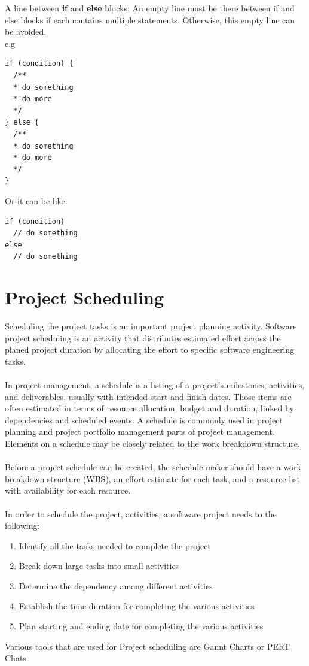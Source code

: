 \begin{enumerate}
A line between \textbf{if} and \textbf{else} blocks: An empty line must be there between if and else blocks if each contains multiple statements. Otherwise, this empty line can be avoided.\\
e.g
\begin{verbatim}
if (condition) {    
  /**
  * do something  
  * do more 
  */  
} else {  
  /**
  * do something  
  * do more 
  */  
}
\end{verbatim}
Or it can be like: 
\begin{verbatim}
if (condition)    
  // do something  
else  
  // do something 
\end{verbatim}
\end{enumerate}


\section{Project Scheduling} %
\label{sec:project_scheduling_}
Scheduling the project tasks is an important project planning activity. Software project scheduling is an activity that distributes estimated effort across the planed project duration by allocating the effort to specific software engineering tasks.\\\\
In project management, a schedule is a listing of a project's milestones, activities, and deliverables, usually with intended start and finish dates. Those items are often estimated in terms of resource allocation, budget and duration, linked by dependencies and scheduled events. A schedule is commonly used in project planning and project portfolio management parts of project management. Elements on a schedule may be closely related to the work breakdown structure.\\\\
Before a project schedule can be created, the schedule maker should have a work breakdown structure (WBS), an effort estimate for each task, and a resource list with availability for each resource.\\\\
In order to schedule the project, activities, a software project needs to the following:
\begin{enumerate}
\item Identify all the tasks needed to complete the project
\item Break down large tasks into small activities
\item Determine the dependency among different activities
\item Establish the time duration for completing the various activities
\item Plan starting and ending date for completing the various activities
\end{enumerate}
Various tools that are used for Project scheduling are Gannt Charts or PERT Chats.
